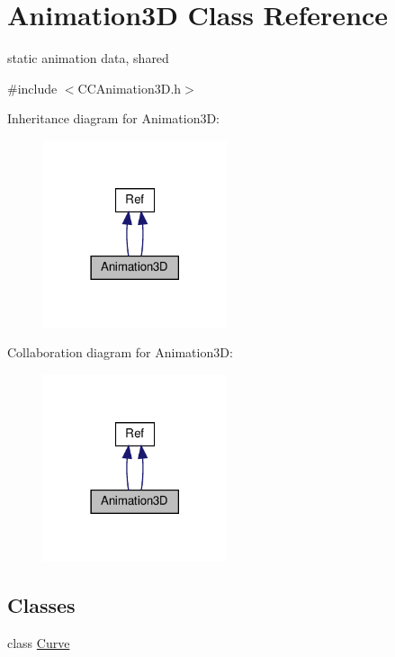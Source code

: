 \hypertarget{classAnimation3D}{}\section{Animation3D Class Reference}
\label{classAnimation3D}


static animation data, shared  




{\ttfamily \#include $<$C\+C\+Animation3\+D.\+h$>$}



Inheritance diagram for Animation3D\+:
\nopagebreak
\begin{figure}[H]
\begin{center}
\leavevmode
\includegraphics[width=153pt]{classAnimation3D__inherit__graph}
\end{center}
\end{figure}


Collaboration diagram for Animation3D\+:
\nopagebreak
\begin{figure}[H]
\begin{center}
\leavevmode
\includegraphics[width=153pt]{classAnimation3D__coll__graph}
\end{center}
\end{figure}
\subsection*{Classes}
\begin{DoxyCompactItemize}
\item 
class \hyperlink{classAnimation3D_1_1Curve}{Curve}
\end{DoxyCompactItemize}

